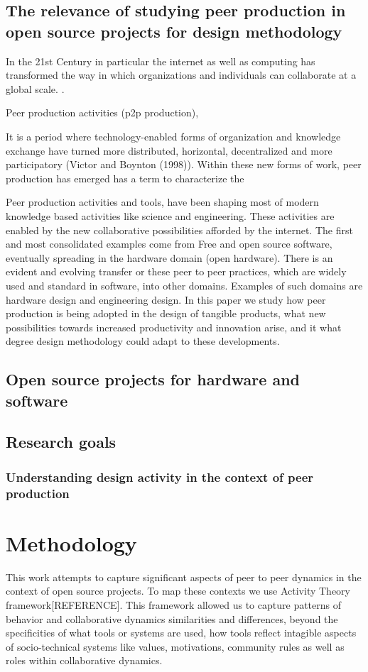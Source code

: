 \documentclass{ICED-Paper}%
\begin{document}
\subsection{The relevance of studying peer production in open source projects for design methodology}
In the 21st Century in particular the internet as well as computing has transformed the way in which organizations and individuals can collaborate at a global scale.  \cite{}.

Peer production activities (p2p production),


It is a period where technology-enabled forms of organization and knowledge exchange have turned more distributed, horizontal, decentralized and more participatory (Victor and Boynton (1998)). Within these new forms of work, peer production has emerged has a term to characterize the

\cite{Mozilla_arch}

 Peer production activities and tools, have been shaping most of modern knowledge based activities like science and engineering. These activities are enabled by the new collaborative possibilities afforded by the internet. The first and most consolidated examples come from Free and open source software, eventually spreading in the hardware domain (open hardware). There is an evident and evolving transfer or these peer to peer practices, which are widely used and standard in software, into other domains. Examples of such domains are hardware design and engineering design. In this paper we study how peer production is being adopted in the design of tangible products, what new possibilities towards increased productivity and innovation arise, and it what degree design methodology could adapt to these developments.
\subsection{Open source projects for hardware and software}

\subsection{Research goals}

\subsubsection{Understanding design activity in the context of peer production}

\section{Methodology}
This work attempts to capture significant aspects of peer to peer dynamics in the context of open source projects. To map these contexts we use Activity Theory framework[REFERENCE]. This framework allowed us to capture patterns of behavior and collaborative dynamics similarities and differences, beyond the specificities of what tools or systems are used, how tools reflect intagible aspects of socio-technical systems like values, motivations, community rules as well as roles within collaborative dynamics.
\end{document}
